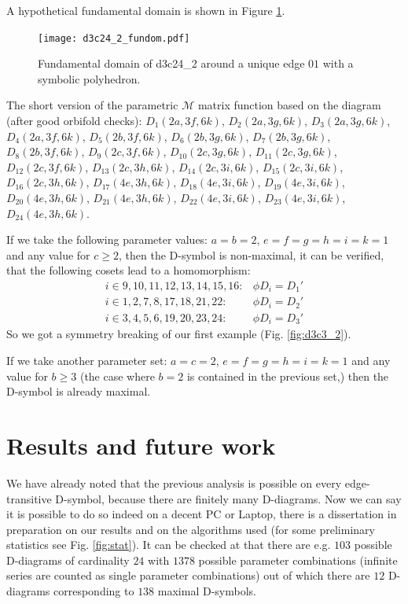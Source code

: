 \documentclass[12pt,a4paper]{article}
\numberwithin{equation}{section}
\theoremstyle{plain}%
\theoremstyle{definition}
\theoremstyle{remark}
\begin{document}
A hypothetical fundamental domain is shown in Figure \ref{fig:d3c24_2_fundom}.

\begin{figure}
  \caption{\label{fig:d3c24_2_fundom} Fundamental domain of d3c24\_2 around a
  unique edge $01$ with a symbolic polyhedron.}
  \center
  \texttt{[image: d3c24\_2\_fundom.pdf]}
\end{figure}

The short version of the parametric $\mathcal{M}$ matrix function based on the
diagram (after good orbifold checks): $D_1(2a, 3f, 6k)$, $D_2(2a, 3g, 6k)$,
$D_3(2a, 3g, 6k)$, $D_4(2a, 3f, 6k)$, $D_5(2b, 3f, 6k)$, $D_6(2b, 3g, 6k)$,
$D_7(2b, 3g, 6k)$, $D_8(2b, 3f, 6k)$, $D_9(2c, 3f, 6k)$, $D_{10}(2c, 3g, 6k)$,
$D_{11}(2c, 3g, 6k)$, $D_{12}(2c, 3f, 6k)$, $D_{13}(2c, 3h, 6k)$, $D_{14}(2c,
3i, 6k)$, $D_{15}(2c, 3i, 6k)$, $D_{16}(2c, 3h, 6k)$, $D_{17}(4e, 3h, 6k)$,
$D_{18}(4e, 3i, 6k)$, $D_{19}(4e, 3i, 6k)$, $D_{20}(4e, 3h, 6k)$, $D_{21}(4e,
3h, 6k)$, $D_{22}(4e, 3i, 6k)$, $D_{23}(4e, 3i, 6k)$, $D_{24}(4e, 3h, 6k)$.

If we take the following parameter values: $a=b=2$, $e=f=g=h=i=k=1$ and any value
for $c\geq2$, then the D-symbol is non-maximal, it can be verified, that the
following cosets lead to a homomorphism:
\begin{align}
  i\in{9,10,11,12,13,14,15,16}: & \phi{D_i}=D_1' \\
  i\in{1,2,7,8,17,18,21,22}: & \phi{D_i}=D_2' \\
  i\in{3,4,5,6,19,20,23,24}: & \phi{D_i}=D_3'
\end{align}
So we got a symmetry breaking of our first example (Fig. \ref{fig:d3c3_2}).

If we take another parameter set: $a=c=2$, $e=f=g=h=i=k=1$ and any value
for $b\geq3$ (the case where $b=2$ is contained in the previous set,)
then the D-symbol is already maximal.

\section{Results and future work}
We have already noted that the previous analysis is possible on every
edge-transitive D-symbol, because there are finitely many D-diagrams. Now we can
say it is possible to do so indeed on a decent PC or Laptop, there is a
dissertation in preparation on our results and on the algorithms used (for some
preliminary statistics see Fig. \ref{fig:stat}). It can be
checked at \cite{MYHOME_edge_trans} that there are e.g. $103$ possible
D-diagrams of cardinality $24$ with $1378$ possible parameter combinations
(infinite series are counted as single parameter combinations) out of which
there are $12$ D-diagrams corresponding to $138$ maximal D-symbols.
\end{document}
